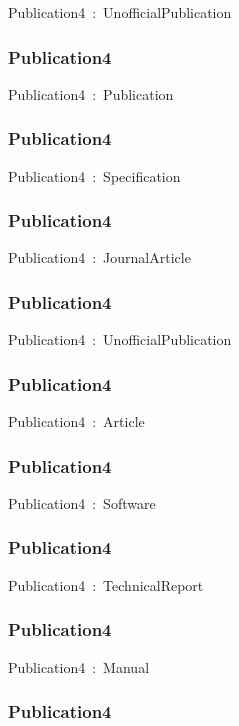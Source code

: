 \documentclass{article}
\begin{document}
Publication4~:~UnofficialPublication

\subsubsection*{Publication4}

Publication4~:~Publication

\subsubsection*{Publication4}

Publication4~:~Specification

\subsubsection*{Publication4}

Publication4~:~JournalArticle

\subsubsection*{Publication4}

Publication4~:~UnofficialPublication

\subsubsection*{Publication4}

Publication4~:~Article

\subsubsection*{Publication4}

Publication4~:~Software

\subsubsection*{Publication4}

Publication4~:~TechnicalReport

\subsubsection*{Publication4}

Publication4~:~Manual

\subsubsection*{Publication4}
\end{document}
